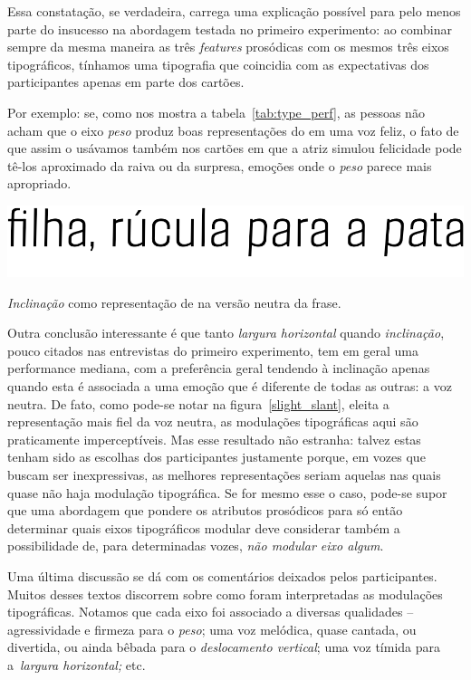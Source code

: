 \documentclass{tufte-handout}
\newcommand{\textls}[2][5]{%
    \begingroup\addfontfeatures{LetterSpace=#1}#2\endgroup
  }
\renewcommand{\smallcapsspacing}[1]{\textls[10]{#1}}
\renewcommand{\textsc}[1]{\smallcapsspacing{\textsmallcaps{#1}}}
\begin{document}
Essa constatação, se verdadeira, carrega uma explicação possível para pelo menos parte do insucesso na abordagem testada no primeiro experimento: ao combinar sempre da mesma maneira as três \textit{features} prosódicas com os mesmos três eixos tipográficos, tínhamos uma tipografia que coincidia com as expectativas dos participantes apenas em parte dos cartões.

Por exemplo: se, como nos mostra a tabela~\ref{tab:type_perf}, as pessoas não acham que o eixo \textit{peso} produz boas representações do \textsc{rms} em uma voz feliz, o fato de que assim o usávamos também nos cartões em que a atriz simulou felicidade pode tê-los aproximado da raiva ou da surpresa, emoções onde o \textit{peso} parece mais apropriado.

\begin{marginfigure}[15\baselineskip]
  \includegraphics{imgs/slight-slant.png}
  \caption{\textit{Inclinação} como representação de \textsc{rms} na versão neutra da frase.}
  \label{slight_slant}
\end{marginfigure}

Outra conclusão interessante é que tanto \textit{largura horizontal} quando \textit{inclinação}, pouco citados nas entrevistas do primeiro experimento, tem em geral uma performance mediana, com a preferência geral tendendo à inclinação apenas quando esta é associada a uma emoção que é diferente de todas as outras: a voz neutra. De fato, como pode-se notar na figura~\ref{slight_slant}, eleita a representação mais fiel da voz neutra, as modulações tipográficas aqui são praticamente imperceptíveis. Mas esse resultado não estranha: talvez estas tenham sido as escolhas dos participantes justamente porque, em vozes que buscam ser inexpressivas, as melhores representações seriam aquelas nas quais quase não haja modulação tipográfica. Se for mesmo esse o caso, pode-se supor que uma abordagem que pondere os atributos prosódicos para só então determinar quais eixos tipográficos modular deve considerar também a possibilidade de, para determinadas vozes, \textit{não modular eixo algum}.

Uma última discussão se dá com os comentários deixados pelos participantes. Muitos desses textos discorrem sobre como foram interpretadas as modulações tipográficas. Notamos que cada eixo foi associado a diversas qualidades -- agressividade e firmeza para o \textit{peso}; uma voz melódica, quase cantada, ou divertida, ou ainda bêbada para o \textit{deslocamento vertical}; uma voz tímida para a~\textit{largura horizontal;} etc. 
\end{document}
